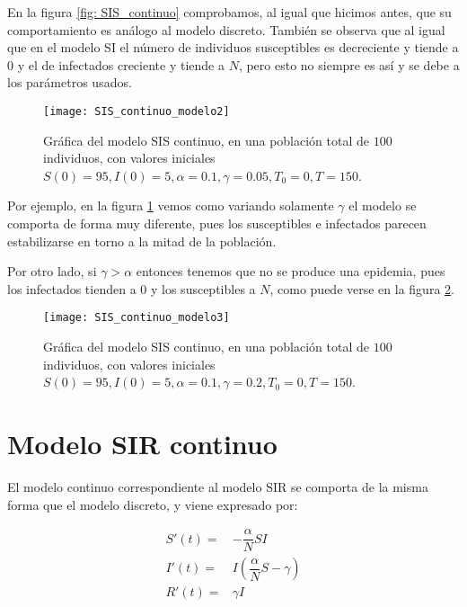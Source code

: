 En la figura \ref{fig: SIS_continuo} comprobamos, al igual que hicimos antes, que su comportamiento es análogo al modelo discreto. También se observa que al igual que en el modelo SI el número de individuos susceptibles es decreciente y tiende a $0$ y el de infectados creciente y tiende a $N$, pero esto no siempre es así y se debe a los parámetros usados.

\begin{figure}
\begin{center}
\caption{Gráfica del modelo SIS continuo, en una población total de $100$ individuos, con valores iniciales $S(0)=95, I(0) = 5, \alpha = 0.1, \gamma = 0.05, T_0 = 0, T = 150$.}
\label{fig: SIS_continuo2}
\texttt{[image: SIS\_continuo\_modelo2]}
\end{center}
\end{figure}


Por ejemplo, en la figura \ref{fig: SIS_continuo2} vemos como variando solamente $\gamma$ el modelo se comporta de forma muy diferente, pues los susceptibles e infectados parecen estabilizarse en torno a la mitad de la población.

Por otro lado, si $\gamma > \alpha$ entonces tenemos que no se produce una epidemia, pues los infectados tienden a $0$ y los susceptibles a $N$, como puede verse en la figura \ref{fig: SIS_continuo3}.

\begin{figure}
\begin{center}
\caption{Gráfica del modelo SIS continuo, en una población total de $100$ individuos, con valores iniciales $S(0)=95, I(0) = 5, \alpha = 0.1, \gamma = 0.2, T_0 = 0, T = 150$.}
\label{fig: SIS_continuo3}
\texttt{[image: SIS\_continuo\_modelo3]}
\end{center}
\end{figure}


\section{Modelo SIR continuo}


El modelo continuo correspondiente al modelo SIR se comporta de la misma forma que el modelo discreto, y viene expresado por:

\begin{equation}
\label{eqn: modelo_SIR_continuo}
\begin{aligned}
S'(t) = & -\dfrac{\alpha}{N}SI \\
I'(t) = & I\left(\dfrac{\alpha}{N}S-\gamma \right) \\
R'(t) = & \gamma I
\end{aligned}
\end{equation}


